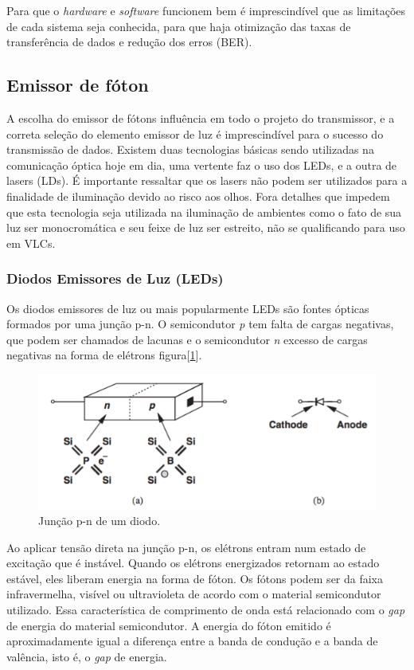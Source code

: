 Para que o \textit{hardware} e \textit{software} funcionem bem é imprescindível que as limitações de cada sistema seja conhecida, para que haja otimização das taxas de transferência de dados e redução dos erros (BER).
 
\subsection{Emissor de fóton}

A escolha do emissor de fótons influência em todo o projeto do transmissor, e a correta seleção do elemento emissor de luz é imprescindível para o sucesso do transmissão de dados. 
Existem duas tecnologias básicas sendo utilizadas na comunicação óptica hoje em dia, uma vertente faz o uso dos LEDs, e a outra de lasers (LDs).
É importante ressaltar que os lasers não podem ser utilizados para a finalidade de iluminação devido ao risco aos olhos. Fora detalhes que impedem que esta tecnologia seja utilizada na iluminação de ambientes como o fato de sua luz ser monocromática e seu feixe de luz ser estreito, não se qualificando para uso em VLCs.

\subsubsection{Diodos Emissores de Luz (LEDs)}

Os diodos emissores de luz ou mais popularmente LEDs são fontes ópticas formados por uma
junção p-n. O semicondutor \textit{p} tem falta de cargas negativas, que podem ser chamados de lacunas e o semicondutor \textit{n} excesso de cargas negativas na forma de elétrons figura[\ref{Fig: juncao-pn}]. \cite{Razavi}

\begin{figure}
	\centering
		\includegraphics[width = 12cm]{figuras/juncao-pn}
	\caption{Junção p-n de um diodo.\cite{Razavi}}
	\label{Fig: juncao-pn}
\end{figure}


Ao aplicar tensão direta na junção p-n, os elétrons entram num estado de excitação que é instável. Quando os elétrons energizados retornam ao estado estável, eles liberam energia na forma de fóton. 
Os fótons podem ser da faixa infravermelha, visível ou ultravioleta de acordo com o material semicondutor utilizado. Essa característica de comprimento de onda está relacionado com o \textit{gap} de energia do material semicondutor. A energia do fóton emitido é aproximadamente igual a diferença entre a banda de condução e a banda de valência, isto é, o \textit{gap} de energia.


